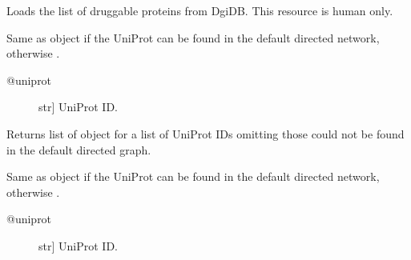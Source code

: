 \documentclass[letterpaper,10pt,english]{sphinxmanual}
\begin{document}
\begin{fulllineitems}
\begin{fulllineitems}
\label{\detokenize{main:pypath.main.PyPath.dps}}
\end{fulllineitems}


\begin{fulllineitems}
\label{\detokenize{main:pypath.main.PyPath.druggability_list}}
Loads the list of druggable proteins from DgiDB. This resource
is human only.

\end{fulllineitems}


\begin{fulllineitems}
\label{\detokenize{main:pypath.main.PyPath.duniprot}}
Same as  object if the UniProt
can be found in the default directed network,
otherwise .
\begin{description}
\item[{@uniprot}] \leavevmode{[}str{]}
UniProt ID.

\end{description}

\end{fulllineitems}


\begin{fulllineitems}
\label{\detokenize{main:pypath.main.PyPath.duniprots}}
Returns list of  object
for a list of UniProt IDs omitting those
could not be found in the default
directed graph.

\end{fulllineitems}


\begin{fulllineitems}
\label{\detokenize{main:pypath.main.PyPath.dup}}
Same as  object if the UniProt
can be found in the default directed network,
otherwise .
\begin{description}
\item[{@uniprot}] \leavevmode{[}str{]}
UniProt ID.


\end{description}
\end{fulllineitems}
\end{fulllineitems}
\end{document}
